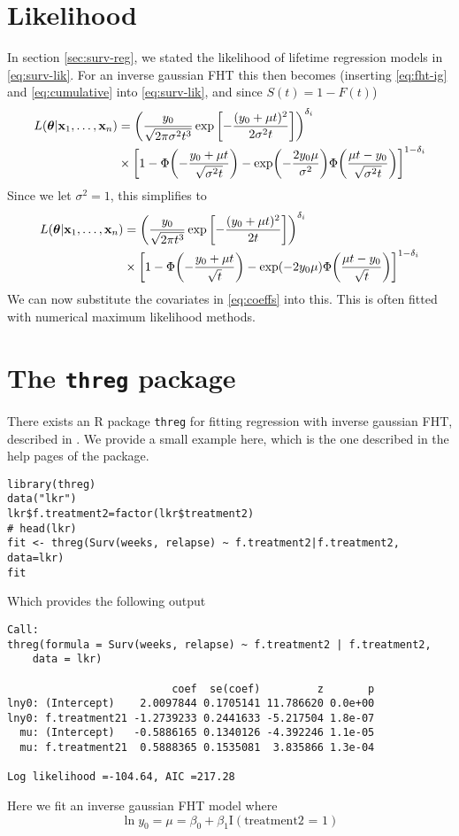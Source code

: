 \section{Likelihood}\label{sec:lik}
In section \ref{sec:surv-reg}, we stated the likelihood of lifetime regression models in \eqref{eq:surv-lik}. For an inverse gaussian FHT this then becomes (inserting \eqref{eq:fht-ig} and \eqref{eq:cumulative} into \eqref{eq:surv-lik}, and since $S(t)=1-F(t)$)
\begin{align}\label{eq:fht-lik}
\begin{split}
L(\btheta|\x_1,\ldots,\x_n)&=\p*{\frac{y_0}{\sqrt{2\pi\sigma^2t^3}}\exp\left[-\frac{(y_0+\mu t)^2}{2\sigma^2t}\right]}^{\delta_i}\\
&\times\sqb*{1-\Phi\p*{-\frac{y_0+\mu t}{\sqrt{\sigma^2t}}}-\exp\p*{-\frac{2y_0\mu}{\sigma^2}}\Phi\p*{\frac{\mu t-y_0}{\sqrt{\sigma^2t}}}}^{1-\delta_i}
\end{split}
\end{align}
Since we let $\sigma^2=1$, this simplifies to
\begin{align}
\begin{split}
L(\btheta|\x_1,\ldots,\x_n)&=\p*{\frac{y_0}{\sqrt{2\pi t^3}}\exp\left[-\frac{(y_0+\mu t)^2}{2t}\right]}^{\delta_i}\\
&\times\sqb*{1-\Phi\p*{-\frac{y_0+\mu t}{\sqrt{t}}}-\exp\p*{-2y_0\mu}\Phi\p*{\frac{\mu t-y_0}{\sqrt{t}}}}^{1-\delta_i}
\end{split}
\end{align}
We can now substitute the covariates in \eqref{eq:coeffs} into this. This is often fitted with numerical maximum likelihood methods.

\section{The \texttt{threg} package}
There exists an R package \texttt{threg} for fitting regression with inverse gaussian FHT, described in \cite{threg}. We provide a small example here, which is the one described in the help pages of the package.
\begin{verbatim}
library(threg)
data("lkr")
lkr$f.treatment2=factor(lkr$treatment2)
# head(lkr)
fit <- threg(Surv(weeks, relapse) ~ f.treatment2|f.treatment2, data=lkr)
fit
\end{verbatim}
Which provides the following output
\begin{verbatim}
Call:
threg(formula = Surv(weeks, relapse) ~ f.treatment2 | f.treatment2, 
    data = lkr)

                          coef  se(coef)         z       p
lny0: (Intercept)    2.0097844 0.1705141 11.786620 0.0e+00
lny0: f.treatment21 -1.2739233 0.2441633 -5.217504 1.8e-07
  mu: (Intercept)   -0.5886165 0.1340126 -4.392246 1.1e-05
  mu: f.treatment21  0.5888365 0.1535081  3.835866 1.3e-04

Log likelihood =-104.64, AIC =217.28
\end{verbatim}
Here we fit an inverse gaussian FHT model where
\[
    \ln y_0=\mu=\beta_0+\beta_1\text{I}(\text{treatment2 = 1})
\]

